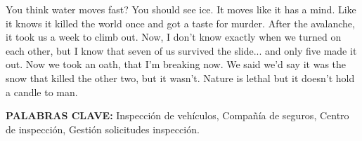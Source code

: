 You think water moves fast? You should see ice. It moves like it has a mind. Like it knows it killed the world once and got a taste for murder. After the avalanche, it took us a week to climb out. Now, I don't know exactly when we turned on each other, but I know that seven of us survived the slide... and only five made it out. Now we took an oath, that I'm breaking now. We said we'd say it was the snow that killed the other two, but it wasn't. Nature is lethal but it doesn't hold a candle to man.

\begin{justify}
	\large{\textbf{PALABRAS CLAVE: }}Inspección de vehículos, Compañía de seguros, Centro de inspección, Gestión solicitudes inspección.
\end{justify}
